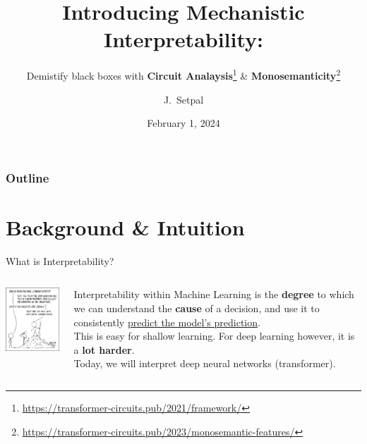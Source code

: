 \documentclass{beamer}
\title[Mechanistic Interpretability]{Introducing Mechanistic Interpretability:}
\subtitle{Demistify black boxes with \textbf{Circuit Analaysis}\thanks{\tiny \url{https://transformer-circuits.pub/2021/framework/}} \& \textbf{Monosemanticity}\thanks{\tiny \url{https://transformer-circuits.pub/2023/monosemantic-features/}}}
\author[Machine Learning @ Purdue] %
{J.~Setpal}
\date{February 1, 2024}
\begin{document}
\frame{\titlepage}


\begin{frame}
\frametitle{Outline}
\tableofcontents
\end{frame}

\section{Background \& Intuition}
\begin{frame}{What is Interpretability?}
	\begin{columns}
		\begin{column}{0.5\textwidth}
			\begin{center}
				\includegraphics[width=5cm]{img/1838} \pause
			\end{center}
		\end{column}
		\begin{column}{0.5\textwidth}
			Interpretability within Machine Learning is the \textbf{degree} to which we can understand the \textbf{cause} of a decision, and use it to consistently \underline{predict the model's prediction}. \pause \newline \\

			This is easy for shallow learning. \pause For deep learning however, it is a \textbf{lot harder}. \pause \newline \\
			Today, we will interpret deep neural networks (transformer). 
		\end{column}
	\end{columns}
\end{frame}
\end{document}
